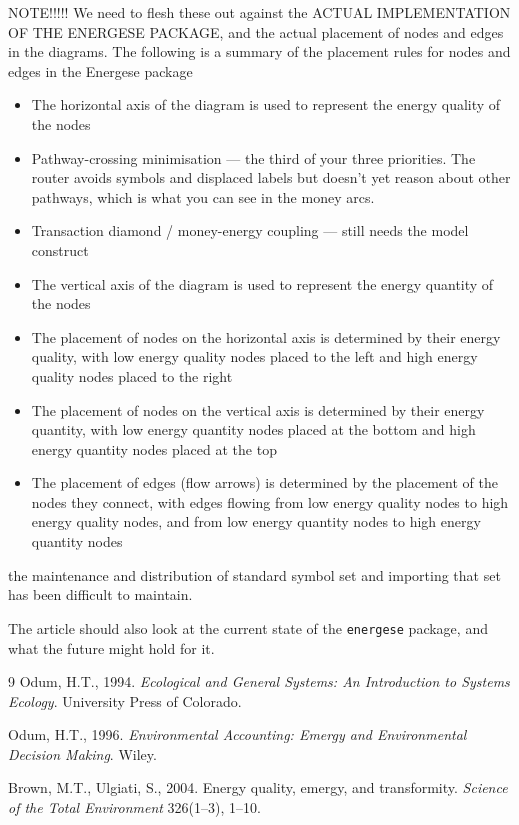 NOTE!!!!! We need to flesh these out against the ACTUAL IMPLEMENTATION OF THE ENERGESE PACKAGE, and the actual placement of nodes and edges in the diagrams. The following is a summary of the placement rules for nodes and edges in the Energese package
\begin{itemize}

    \item The horizontal axis of the diagram is used to represent the energy quality of the nodes
    \item Pathway-crossing minimisation — the third of your three priorities. The router avoids symbols and displaced labels but doesn't yet reason about other pathways, which is what you can see in the money arcs.
    \item Transaction diamond / money-energy coupling — still needs the model construct
    \item The vertical axis of the diagram is used to represent the energy quantity of the nodes
    \item The placement of nodes on the horizontal axis is determined by their energy quality, with low energy quality nodes placed to the left and high energy quality nodes placed to the right
    \item The placement of nodes on the vertical axis is determined by their energy quantity, with low energy quantity nodes placed at the bottom and high energy quantity nodes placed at the top
    \item The placement of edges (flow arrows) is determined by the placement of the nodes they connect, with edges flowing from low energy quality nodes to high energy quality nodes, and from low energy quantity nodes to high energy quantity nodes
\end{itemize}





the maintenance and distribution of standard symbol set and importing that set has been difficult to maintain.  

The article should also look at the current state of the \texttt{energese} package, and what the future might hold for it.

\begin{thebibliography}{9}
Odum, H.T., 1994. \emph{Ecological and General Systems: An Introduction to
Systems Ecology}. University Press of Colorado.

Odum, H.T., 1996. \emph{Environmental Accounting: Emergy and Environmental
Decision Making}. Wiley.

Brown, M.T., Ulgiati, S., 2004. Energy quality, emergy, and transformity.
\emph{Science of the Total Environment} 326(1--3), 1--10.

\end{thebibliography}



